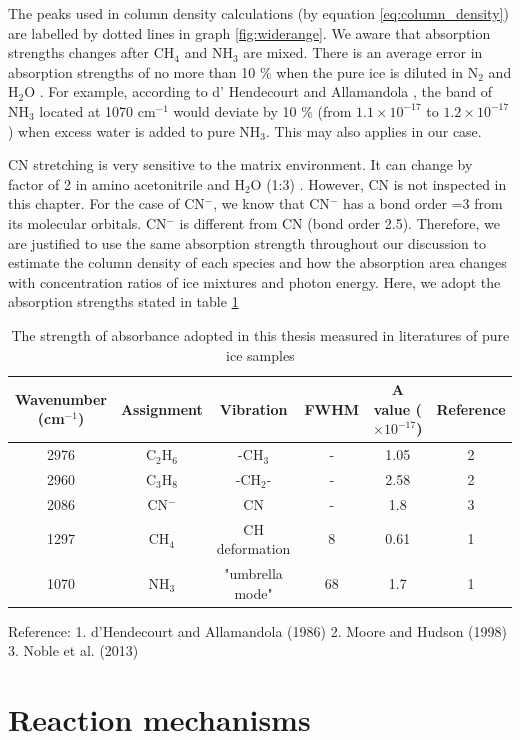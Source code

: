 The peaks used in column density calculations (by equation \ref{eq:column_density}) are labelled by dotted lines in graph \ref{fig:widerange}. We aware that absorption strengths changes after CH$_4$ and NH$_3$ are mixed. There is an average error in absorption strengths of no more than 10 \%  when the pure ice is diluted in N$_2$ and H$_2$O \cite{richey2012near}. For example, according to d' Hendecourt and Allamandola \cite{d1986time}, the band of NH$_3$ located at 1070 cm$^{-1}$ would deviate by 10 \% (from $1.1 \times 10^{-17}$ to $1.2 \times 10^{-17}$) when excess water is added to pure NH$_3$. This may also applies in our case.

CN stretching is very sensitive to the matrix environment. It can change by factor of 2 in amino acetonitrile and H$_2$O (1:3) \cite{borget2012aminoacetonitrile}. However, CN is not inspected in this chapter. For the case of CN$^-$, we know that CN$^-$ has a bond order =3 from its molecular orbitals. CN$^-$ is different from CN (bond order 2.5). Therefore, we are justified to use the same absorption strength throughout our discussion to estimate the column density of each species and how the absorption area changes with concentration ratios of ice mixtures and photon energy. Here, we adopt the absorption strengths stated in table \ref{tab:Absorbance} \\

\begin{table}[htbp]
\caption{The strength of absorbance adopted in this thesis measured in literatures of pure ice samples}
\label{tab:Absorbance}
\begin{tabular}{cccccc}
\hline
\hline
Wavenumber (cm$^{-1}$) & Assignment  & Vibration & FWHM & A value ($\times 10^{-17}$) & Reference \\
\hline
2976 &  C$_2$H$_6$ & -CH$_3$ & - & 1.05 & 2 \\
2960 & C$_3$H$_8$ & -CH$_2$- & - & 2.58 & 2 \\
2086 & CN$^-$ & CN & - & 1.8 & 3 \\
1297 & CH$_4$ & CH deformation & 8 & 0.61 & 1 \\
1070 & NH$_3$ & "umbrella mode" & 68 & 1.7 & 1 \\
\hline
\end{tabular}
Reference: 1. d'Hendecourt and Allamandola (1986)\cite{d1986time} 2. Moore and Hudson (1998)\cite{moore1998infrared} 3. Noble et al. (2013) \cite{noble2012thermal}
\end{table}


\section{Reaction mechanisms} %

